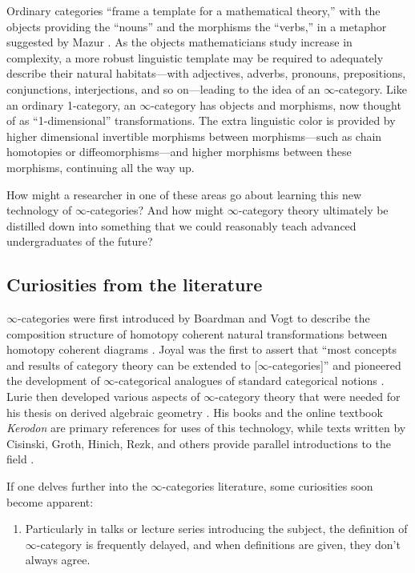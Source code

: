 \documentclass[11pt]{ctexart}
\theoremstyle{definition}
\theoremstyle{remark}
\numberwithin{equation}{section}
\newcommand{\1}{\mathbbe{1}}
\newcommand{\2}{\mathbbe{2}}
\newcommand{\3}{\mathbbe{3}}
\begin{document}
Ordinary categories ``frame a template for a mathematical theory,''  with the objects providing the ``nouns'' and the morphisms the ``verbs,'' in a metaphor suggested by Mazur \cite{Mazur}. 
 As the objects mathematicians study increase in complexity, a more robust linguistic template may be required to adequately describe their natural habitats---with adjectives, adverbs, pronouns, prepositions, conjunctions, interjections, and so on---leading to the idea of an $\infty$-category. Like an ordinary 1-category, an $\infty$-category has objects and morphisms, now thought of as ``1-dimensional'' transformations. The extra linguistic color is provided by higher dimensional invertible morphisms between morphisms---such as chain homotopies or diffeomorphisms---and higher morph\-isms between these morphisms, continuing all the way up.

How might a researcher in one of these areas go about learning this new technology of $\infty$-categories? And how might $\infty$-category theory ultimately be distilled down into something that we could reasonably teach advanced undergraduates of the future?

\subsection*{Curiosities from the literature}

$\infty$-categories were first introduced by Boardman and Vogt to describe the composition structure of homotopy coherent natural transformations between homotopy coherent diagrams \cite{BV}. Joyal was the first to assert that ``most concepts and results of category theory can be extended to [$\infty$-categories]'' and pioneered the development of $\infty$-categorical analogues of standard categorical notions \cite{joyal-quasi,joyal-theory}. 
  Lurie then developed various aspects of $\infty$-category theory that were needed for his thesis on derived algebraic geometry \cite{lurie-on-topoi, lurie-thesis}. 
    His books \cite{lurie-topos,lurie-algebra}
  and the online textbook \emph{Kerodon} \cite{lurie-kerodon} are primary references for uses of this technology, while texts written by Cisinski, Groth, Hinich, Rezk, and others provide parallel introductions to the field \cite{Cisinski, groth, hinich, rezk}.

If one delves further into the $\infty$-categories literature, some curiosities soon become apparent:

\begin{enumerate}
\item Particularly in talks or lecture series introducing the subject, the definition of $\infty$-category is frequently delayed, and when definitions are given, they don't always agree.
\end{enumerate}
\end{document}
